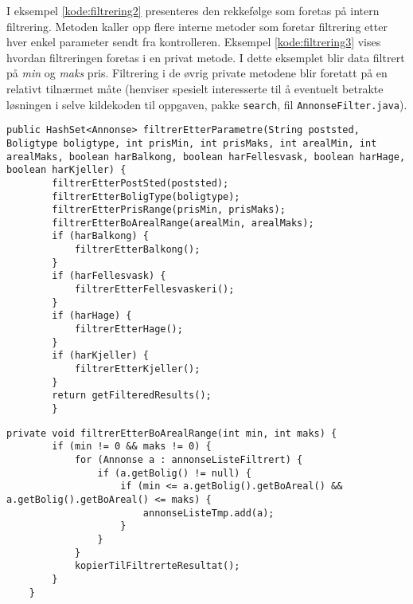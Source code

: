 I eksempel \ref{kode:filtrering2} presenteres den rekkefølge som foretas på intern filtrering. Metoden kaller opp flere interne metoder som foretar filtrering etter hver enkel parameter sendt fra kontrolleren. Eksempel \ref{kode:filtrering3} vises hvordan filtreringen foretas i en privat metode. I dette eksemplet blir data filtrert på \textit{min} og \textit{maks} pris. Filtrering i de øvrig private metodene blir foretatt på en relativt tilnærmet måte (henviser spesielt interesserte til å eventuelt betrakte løsningen i selve kildekoden til oppgaven, pakke \texttt{search}, fil \texttt{AnnonseFilter.java}). 

\begin{lstlisting}[caption={[AnnonseFilter.java: Filtreringsrekkefølge]AnnonseFilter.java: Filtreringsrekkefølge etter mottatte parametre.}, label=kode:filtrering2]
	public HashSet<Annonse> filtrerEtterParametre(String poststed, Boligtype boligtype, int prisMin, int prisMaks, int arealMin, int arealMaks, boolean harBalkong, boolean harFellesvask, boolean harHage, boolean harKjeller) {
        filtrerEtterPostSted(poststed);
        filtrerEtterBoligType(boligtype);
        filtrerEtterPrisRange(prisMin, prisMaks);
        filtrerEtterBoArealRange(arealMin, arealMaks);
        if (harBalkong) {
            filtrerEtterBalkong();
        }
        if (harFellesvask) {
            filtrerEtterFellesvaskeri();
        }
        if (harHage) {
            filtrerEtterHage();
        }
        if (harKjeller) {
            filtrerEtterKjeller();
        }
        return getFilteredResults();
    	}
\end{lstlisting}
    
\begin{lstlisting}[caption={[AnnonseFilter.java: privat filtreringsklasse]AnnonseFilter.java: Eksepel på privat filtreringsklasse etter bolig areal som foretas mellom trinn for pris og balkong.}, label=kode:filtrering3]
    private void filtrerEtterBoArealRange(int min, int maks) {
        if (min != 0 && maks != 0) {
            for (Annonse a : annonseListeFiltrert) {
                if (a.getBolig() != null) {
                    if (min <= a.getBolig().getBoAreal() && a.getBolig().getBoAreal() <= maks) {
                        annonseListeTmp.add(a);
                    }
                }
            }
            kopierTilFiltrerteResultat();
        }
    }
\end{lstlisting}